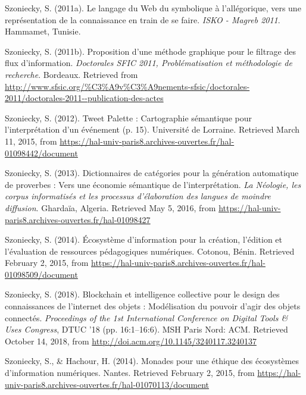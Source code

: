 \documentclass[
  a4paper,
  DIV=11,
  numbers=noendperiod]{scrreprt}
\newlength{\cslhangindent}
\newenvironment{CSLReferences}[2] %
 {\begin{list}{}{%
  \setlength{\itemindent}{0pt}
  \setlength{\leftmargin}{0pt}
  \setlength{\parsep}{0pt}
  \ifodd #1
   \setlength{\leftmargin}{\cslhangindent}
   \setlength{\itemindent}{-1\cslhangindent}
  \fi
  \setlength{\itemsep}{#2\baselineskip}}}
 {\end{list}}
\begin{document}
\begin{CSLReferences}{1}{0}
Szoniecky, S. (2011a). Le langage du {Web} du symbolique à
l'allégorique, vers une représentation de la connaissance en train de se
faire. \emph{{ISKO} - {Magreb} 2011}. Hammamet, Tunisie.

Szoniecky, S. (2011b). Proposition d'une méthode graphique pour le
filtrage des flux d'information. \emph{Doctorales {SFIC} 2011,
{Problématisation} et méthodologie de recherche}. Bordeaux. Retrieved
from
\url{http://www.sfsic.org/\%C3\%A9v\%C3\%A9nements-sfsic/doctorales-2011/doctorales-2011--publication-des-actes}

Szoniecky, S. (2012). Tweet {Palette} : Cartographie sémantique pour
l'interprétation d'un événement (p. 15). Université de Lorraine.
Retrieved March 11, 2015, from
\url{https://hal-univ-paris8.archives-ouvertes.fr/hal-01098442/document}

Szoniecky, S. (2013). Dictionnaires de catégories pour la génération
automatique de proverbes : Vers une économie sémantique de
l'interprétation. \emph{La {Néologie}, les corpus informatisés et les
processus d'élaboration des langues de moindre diffusion}. Ghardaïa,
Algeria. Retrieved May 5, 2016, from
\url{https://hal-univ-paris8.archives-ouvertes.fr/hal-01098427}

Szoniecky, S. (2014). Écosystème d'information pour la création,
l'édition et l'évaluation de ressources pédagogiques numériques.
Cotonou, Bénin. Retrieved February 2, 2015, from
\url{https://hal-univ-paris8.archives-ouvertes.fr/hal-01098509/document}

Szoniecky, S. (2018). Blockchain et intelligence collective pour le
design des connaissances de l'internet des objets : Modélisation du
pouvoir d'agir des objets connectés. \emph{Proceedings of the 1st
{International} {Conference} on {Digital} {Tools} \& {Uses} {Congress}},
{DTUC} '18 (pp. 16:1--16:6). MSH Paris Nord: ACM. Retrieved October 14,
2018, from \url{http://doi.acm.org/10.1145/3240117.3240137}

Szoniecky, S., \& Hachour, H. (2014). Monades pour une éthique des
écosystèmes d'information numériques. Nantes. Retrieved February 2,
2015, from
\url{https://hal-univ-paris8.archives-ouvertes.fr/hal-01070113/document}


\end{CSLReferences}
\end{document}

